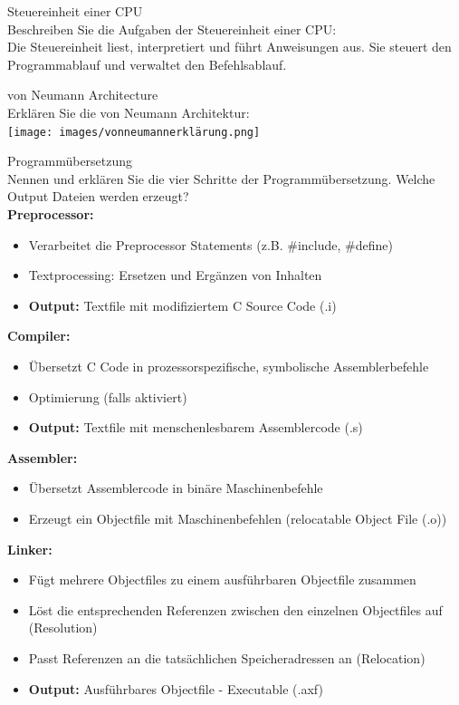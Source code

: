 \begin{example2}{Steuereinheit einer CPU}\\
Beschreiben Sie die Aufgaben der Steuereinheit einer CPU:\\
Die Steuereinheit liest, interpretiert und führt Anweisungen aus. Sie steuert den Programmablauf und verwaltet den Befehlsablauf.
\end{example2}

\begin{example2}{von Neumann Architecture}\\
Erklären Sie die von Neumann Architektur:\\
\texttt{[image: images/vonneumannerklärung.png]}
\end{example2}

\begin{example2}{Programmübersetzung}\\
Nennen und erklären Sie die vier Schritte der Programmübersetzung. Welche Output Dateien werden erzeugt?\\
\textbf{Preprocessor:}
\begin{itemize}
  \item Verarbeitet die Preprocessor Statements (z.B. \#include, \#define)
  \item Textprocessing: Ersetzen und Ergänzen von Inhalten
  \item \textbf{Output:} Textfile mit modifiziertem C Source Code (.i)
\end{itemize}
\textbf{Compiler:}
\begin{itemize}
  \item Übersetzt C Code in prozessorspezifische, symbolische Assemblerbefehle
  \item Optimierung (falls aktiviert)
  \item \textbf{Output:} Textfile mit menschenlesbarem Assemblercode (.s)
\end{itemize}
\textbf{Assembler:}
\begin{itemize}
  \item Übersetzt Assemblercode in binäre Maschinenbefehle
  \item Erzeugt ein Objectfile mit Maschinenbefehlen (relocatable Object File (.o))
\end{itemize}
\textbf{Linker:}
\begin{itemize}
  \item Fügt mehrere Objectfiles zu einem ausführbaren Objectfile zusammen
  \item Löst die entsprechenden Referenzen zwischen den einzelnen Objectfiles auf (Resolution)
  \item Passt Referenzen an die tatsächlichen Speicheradressen an (Relocation)
  \item \textbf{Output:} Ausführbares Objectfile - Executable (.axf)
\end{itemize}
\end{example2}


